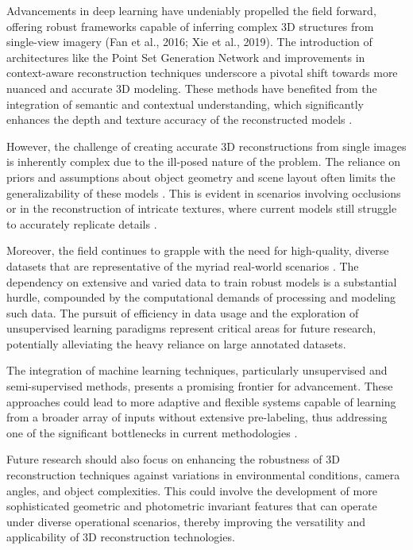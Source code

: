 \documentclass[conference]{IEEEtran}
\begin{document}
Advancements in deep learning have undeniably propelled the field forward, offering robust frameworks capable of inferring complex 3D structures from single-view imagery (Fan et al., 2016; Xie et al., 2019). The introduction of architectures like the Point Set Generation Network \cite{fan2016} and improvements in context-aware reconstruction techniques \cite{xie2019} underscore a pivotal shift towards more nuanced and accurate 3D modeling. These methods have benefited from the integration of semantic and contextual understanding, which significantly enhances the depth and texture accuracy of the reconstructed models \cite{popov2020}.

However, the challenge of creating accurate 3D reconstructions from single images is inherently complex due to the ill-posed nature of the problem. The reliance on priors and assumptions about object geometry and scene layout often limits the generalizability of these models \cite{fan2016}. This is evident in scenarios involving occlusions or in the reconstruction of intricate textures, where current models still struggle to accurately replicate details \cite{popov2020}. 

Moreover, the field continues to grapple with the need for high-quality, diverse datasets that are representative of the myriad real-world scenarios \cite{popov2020}. The dependency on extensive and varied data to train robust models is a substantial hurdle, compounded by the computational demands of processing and modeling such data. The pursuit of efficiency in data usage and the exploration of unsupervised learning paradigms represent critical areas for future research, potentially alleviating the heavy reliance on large annotated datasets.

The integration of machine learning techniques, particularly unsupervised and semi-supervised methods, presents a promising frontier for advancement. These approaches could lead to more adaptive and flexible systems capable of learning from a broader array of inputs without extensive pre-labeling, thus addressing one of the significant bottlenecks in current methodologies \cite{popov2020}.

Future research should also focus on enhancing the robustness of 3D reconstruction techniques against variations in environmental conditions, camera angles, and object complexities. This could involve the development of more sophisticated geometric and photometric invariant features that can operate under diverse operational scenarios, thereby improving the versatility and applicability of 3D reconstruction technologies.
\end{document}
